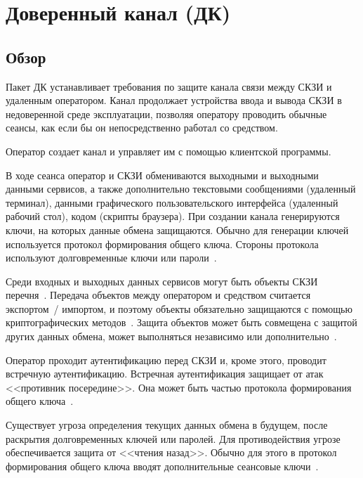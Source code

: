 \section{Доверенный канал (ДК)}\label{TC}

\subsection{Обзор}\label{TC.Intro}

Пакет ДК устанавливает требования по защите канала связи между СКЗИ и удаленным 
оператором. 
%
Канал продолжает устройства ввода и вывода СКЗИ в недоверенной среде 
эксплуатации, позволяя оператору проводить обычные сеансы,
как если бы он непосредственно работал со средством.

Оператор создает канал и управляет им с помощью клиентской программы. 

В ходе сеанса оператор и СКЗИ обмениваются выходными и выходными данными 
сервисов, а также дополнительно текстовыми сообщениями (удаленный терминал),  
данными графического пользовательского интерфейса (удаленный рабочий стол),
кодом (скрипты браузера).
%
При создании канала генерируются ключи, на которых данные обмена защищаются. 
Обычно для генерации ключей используется протокол формирования общего 
ключа. Стороны протокола используют долговременные ключи или 
пароли~.

Среди входных и выходных данных сервисов могут быть объекты СКЗИ 
перечня~. Передача объектов между оператором и средством 
считается экспортом~/ импортом, и поэтому объекты обязательно защищаются с помощью 
криптографических методов~. Защита объектов 
может быть совмещена с защитой других данных обмена, может выполняться 
независимо или дополнительно~.

Оператор проходит аутентификацию перед СКЗИ и, кроме этого, проводит встречную 
аутентификацию. Встречная аутентификация защищает от атак <<противник 
посередине>>. Она может быть частью протокола формирования общего 
ключа~.

Существует угроза определения текущих данных обмена в будущем, после раскрытия 
долговременных ключей или паролей. Для противодействия угрозе обеспечивается 
защита от <<чтения назад>>. Обычно для этого в протокол формирования общего ключа
вводят дополнительные сеансовые ключи~. 

